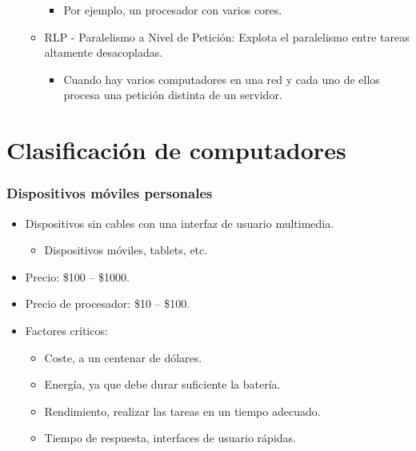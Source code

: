 \documentclass[12pt, twoside, openright]{report} %
\begin{document}
\begin{itemize}
\begin{itemize}
		            \begin{itemize}

			            \item Por ejemplo, un procesador con varios cores.
		            \end{itemize}
		      \item RLP - Paralelismo a Nivel de Petición: Explota el paralelismo
		            entre tareas altamente desacopladas.

		            \begin{itemize}

			            \item Cuando hay varios computadores en una red y cada uno de ellos
			                  procesa una petición distinta de un servidor.
		            \end{itemize}
	      \end{itemize}
\end{itemize}

\section{Clasificación de computadores}


\subsubsection{Dispositivos móviles personales}

\begin{itemize}

	\item Dispositivos sin cables con una interfaz de usuario multimedia.

	      \begin{itemize}

		      \item Dispositivos móviles, tablets, etc.
	      \end{itemize}
	\item Precio: \$100 -- \$1000.
	\item Precio de procesador: \$10 -- \$100.
	\item Factores críticos:

	      \begin{itemize}

		      \item Coste, a un centenar de dólares.
		      \item Energía, ya que debe durar suficiente la batería.
		      \item Rendimiento, realizar las tareas en un tiempo adecuado.
		      \item Tiempo de respuesta, interfaces de usuario rápidas.
	      \end{itemize}
\end{itemize}
\end{document}
